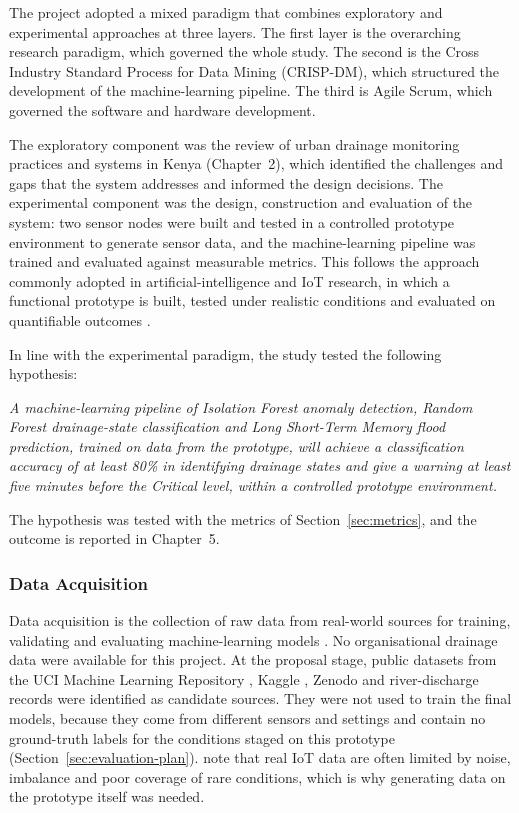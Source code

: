 \documentclass[12pt, a4paper]{article}
\begin{document}
The project adopted a mixed paradigm that combines exploratory and experimental approaches at three layers. The first layer is the overarching research paradigm, which governed the whole study. The second is the Cross Industry Standard Process for Data Mining (CRISP-DM), which structured the development of the machine-learning pipeline. The third is Agile Scrum, which governed the software and hardware development.

The exploratory component was the review of urban drainage monitoring practices and systems in Kenya (Chapter~2), which identified the challenges and gaps that the system addresses and informed the design decisions. The experimental component was the design, construction and evaluation of the system: two sensor nodes were built and tested in a controlled prototype environment to generate sensor data, and the machine-learning pipeline was trained and evaluated against measurable metrics. This follows the approach commonly adopted in artificial-intelligence and IoT research, in which a functional prototype is built, tested under realistic conditions and evaluated on quantifiable outcomes \citep{sathiyamoorthy2025}.

In line with the experimental paradigm, the study tested the following hypothesis:

\textit{A machine-learning pipeline of Isolation Forest anomaly detection, Random Forest drainage-state classification and Long Short-Term Memory flood prediction, trained on data from the prototype, will achieve a classification accuracy of at least 80\% in identifying drainage states and give a warning at least five minutes before the Critical level, within a controlled prototype environment.}

The hypothesis was tested with the metrics of Section~\ref{sec:metrics}, and the outcome is reported in Chapter~5.

\subsubsection{Data Acquisition}
\label{sec:data-acquisition}

Data acquisition is the collection of raw data from real-world sources for training, validating and evaluating machine-learning models \citep{bao2025}. No organisational drainage data were available for this project. At the proposal stage, public datasets from the UCI Machine Learning Repository \citep{gas_sensor_array_drift_dataset_224,twin_gas_sensor_arrays_361}, Kaggle \citep{iot_tsensor_kaggle,sensor_data_joshi,flood_prediction_kaggle,urban_flood_risk_kaggle}, Zenodo \citep{zenodo_flood_quality} and river-discharge records \citep{grdc_data,glofas_era5} were identified as candidate sources. They were not used to train the final models, because they come from different sensors and settings and contain no ground-truth labels for the conditions staged on this prototype (Section~\ref{sec:evaluation-plan}). \citet{zhou2025} note that real IoT data are often limited by noise, imbalance and poor coverage of rare conditions, which is why generating data on the prototype itself was needed.
\end{document}
